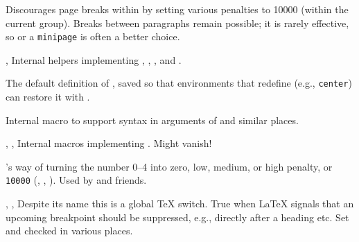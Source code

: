 \documentclass{l3in2edoc}
\begin{document}
\begin{function}[user]
  {
    \samepage
  }
  \begin{syntax}
  \end{syntax}
  Discourages page breaks within  by setting various
  penalties to 10000 (within the current group). Breaks between
  paragraphs remain possible; it is rarely effective, so
   or a \texttt{minipage} is often a better choice.
\end{function}


\begin{function}[int]
  {
    \@no@pgbk,
    \@no@lnbk
  }
  Internal helpers implementing , ,
  , and .
\end{function}

\begin{function}[]
  {
    \@normalcr
  }
  The default definition of \cs{\textbackslash}, saved so that
  environments that redefine \cs{\textbackslash} (e.g., \texttt{center}) can
  restore it with \cs{\textbackslash}.
\end{function}


\begin{function}[int]
  {
    \@vspace@calcify
  }
  Internal macro to support  syntax in arguments of
   and similar places.
\end{function}



\begin{function}[int]
  {
    \@newline,
    \@gnewline,
    \@xnewline
  }
  Internal macros implementing . Might vanish!
\end{function}




\begin{function}[]
  {
    \@getpen
  }
  \begin{syntax}
     
  \end{syntax}
  \LaTeXe's way of turning the number 0--4 into zero, low, medium,
  or high penalty, or \texttt{10000} (,
  , ). Used by  and
  friends.
\end{function}






\begin{function}[]
  {
    \if@nobreak,
    \@nobreakfalse,
    \@nobreaktrue
  }
  Despite its name this is a global \TeX{} switch. True when
  \LaTeX{} signals that an upcoming breakpoint should be suppressed,
  e.g., directly after a heading etc. Set and checked in various places.
\end{function}
\end{document}
